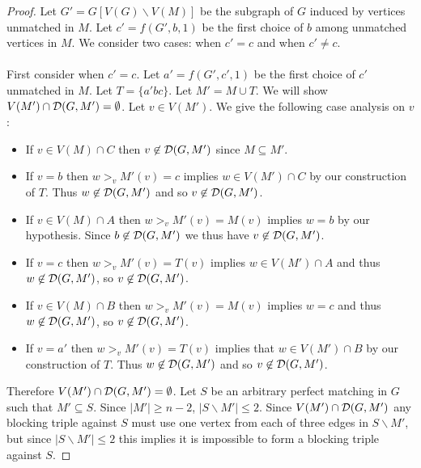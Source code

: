 \begin{proof}
Let $G' = G[V(G)\backslash V(M)]$ be the subgraph of $G$ induced by vertices unmatched in $M$. Let $c' = f(G',b,1)$ be the first choice of $b$ among unmatched vertices in $M$. We consider two cases: when $c' = c$ and when $c' \neq c$.

\paragraph{} First consider when $c' = c$.  Let $a' = f(G',c', 1)$ be the first choice of $c'$ unmatched in $M$. Let $T = \{a'bc\}$. Let $M' = M \cup T$. We will show $V(M') \cap \mathcal{D}(G,M') =\emptyset$. Let $v \in V(M')$. We give the following case analysis on $v$:
\begin{itemize} 
\item If $v \in V(M) \cap C$ then $v \not\in \mathcal{D}(G,M')$ since $M \subseteq M'$.
\item If $v = b$ then $w >_v M'(v) = c$ implies $w \in V(M') \cap C$ by our construction of $T$. Thus $w \not\in \mathcal{D}(G,M')$ and so $v \not\in \mathcal{D}(G,M')$.
\item If $v \in V(M) \cap A$ then $w >_v M'(v) = M(v)$ implies $w = b$ by our hypothesis. Since $b \not\in \mathcal{D}(G,M')$ we thus have $v \not\in \mathcal{D}(G,M')$. 
\item If $v = c$ then $w>_v M'(v) = T(v)$ implies $w \in V(M') \cap A$ and thus $w \not\in \mathcal{D}(G,M')$, so $v\not\in \mathcal{D}(G,M')$.
\item If $v \in V(M) \cap B$ then $w>_v M'(v)=M(v)$ implies $w = c$ and thus $w \not\in \mathcal{D}(G,M')$, so $v \not\in \mathcal{D}(G,M')$.
\item If $v = a'$ then $w >_v M'(v) = T(v)$ implies that $w \in V(M') \cap B$ by our construction of $T$. Thus $w\not\in \mathcal{D}(G,M')$ and so $v\not\in \mathcal{D}(G,M')$. 
\end{itemize}
Therefore $V(M') \cap \mathcal{D}(G,M') = \emptyset$. Let $S$ be an arbitrary perfect matching in $G$ such that $M' \subseteq S$. Since $|M'| \geq n-2$, $|S\backslash M'| \leq 2$. Since $V(M') \cap \mathcal{D}(G,M')$ any blocking triple against $S$ must use one vertex from each of three edges in $S\backslash M'$, but since $|S\backslash M'| \leq 2$ this implies it is impossible to form a blocking triple against $S$.

\end{proof}
